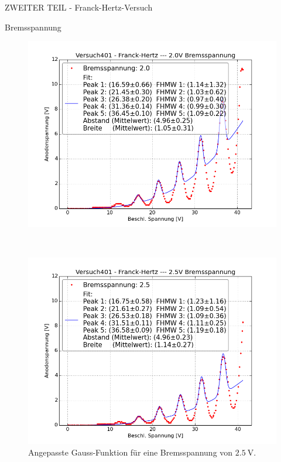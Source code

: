 \begin{appendix}
\begin{chapter}{ZWEITER TEIL - Franck-Hertz-Versuch}
\begin{section}{Bremsspannung}
\begin{figure}[htbp!]
\begin{minipage}{0.48\textwidth}
          \includegraphics[width=\textwidth]
              {Figures/Versuch401-Franck-Hertz-2_0VBremsspannung_Beschl_Spannung_Anodenspannung.png}
          \caption{Angepasste Gauss-Funktion für eine Bremsspannung von 
              $\SI{2.0}{\volt}$.}
          \label{fig:AnhangFHB20V}
        \end{minipage} \\
        \begin{minipage}{0.48\textwidth}
          \centering
          \includegraphics[width=\textwidth]
              {Figures/Versuch401-Franck-Hertz-2_5VBremsspannung_Beschl_Spannung_Anodenspannung.png}
          \caption{Angepasste Gauss-Funktion für eine Bremsspannung von 
              $\SI{2.5}{\volt}$.}

\end{minipage}
\end{figure}
\end{section}
\end{chapter}
\end{appendix}
